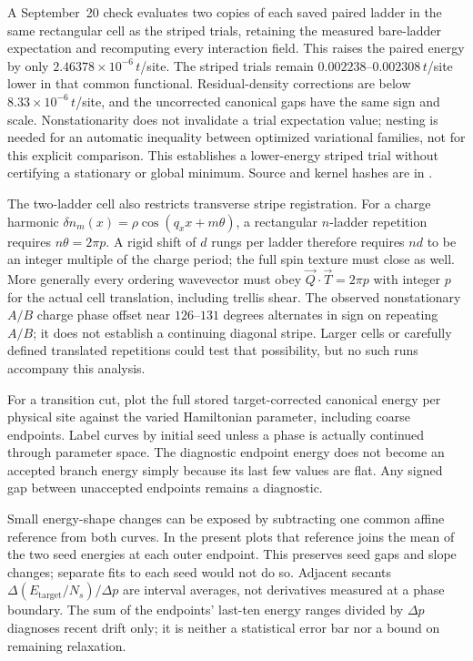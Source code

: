 \documentclass[11pt]{article}
\begin{document}
A September~20 check evaluates two copies of each saved paired ladder in
the same rectangular cell as the striped trials, retaining the measured
bare-ladder expectation and recomputing every interaction field. This raises
the paired energy by only $2.46378\times10^{-6}\,t$/site. The striped trials
remain $0.002238$--$0.002308\,t$/site lower in that common functional.
Residual-density corrections are below $8.33\times10^{-6}\,t$/site, and the
uncorrected canonical gaps have the same sign and scale. Nonstationarity
does not invalidate a trial expectation value; nesting is needed for an
automatic inequality between optimized variational families, not for this
explicit comparison. This establishes a lower-energy striped trial without
certifying a stationary or global minimum. Source and kernel hashes are in
.

The two-ladder cell also restricts transverse stripe registration. For a
charge harmonic $\delta n_m(x)=\rho\cos(q_xx+m\theta)$, a rectangular
$n$-ladder repetition requires $n\theta=2\pi p$. A rigid shift of $d$ rungs
per ladder therefore requires $nd$ to be an integer multiple of the charge
period; the full spin texture must close as well. More generally every
ordering wavevector must obey $\vec Q\cdot\vec T=2\pi p$ with integer $p$
for the actual cell translation, including trellis shear. The observed
nonstationary $A/B$ charge phase offset near $126$--$131$ degrees alternates
in sign on repeating $A/B$; it does not establish a continuing diagonal
stripe. Larger cells or carefully defined translated repetitions could
test that possibility, but no such runs accompany this analysis.

For a transition cut, plot the full stored target-corrected canonical
energy per physical site against the varied Hamiltonian parameter, including
coarse endpoints. Label curves by initial seed unless a phase is actually
continued through parameter space. The diagnostic endpoint energy does
not become an accepted branch energy simply because its last few values
are flat. Any signed gap between unaccepted endpoints remains a diagnostic.

Small energy-shape changes can be exposed by subtracting one common affine
reference from both curves. In the present plots that reference joins the
mean of the two seed energies at each outer endpoint. This preserves seed
gaps and slope changes; separate fits to each seed would not do so. Adjacent
secants $\Delta(E_{\mathrm{target}}/N_s)/\Delta p$ are interval averages,
not derivatives measured at a phase boundary. The sum of the endpoints'
last-ten energy ranges divided by $\Delta p$ diagnoses recent drift only;
it is neither a statistical error bar nor a bound on remaining relaxation.
\end{document}
